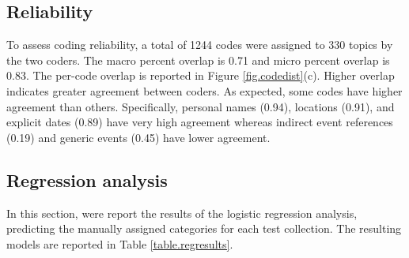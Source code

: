 \documentclass[runningheads,a4paper]{llncs}
\begin{document}

\subsection{Reliability}

To assess coding reliability, a total of 1244 codes were assigned to 330 topics by the two coders. The macro percent overlap is 0.71 and  micro percent overlap is 0.83. The per-code overlap is reported in Figure \ref{fig.codedist}(c). Higher overlap indicates greater agreement between coders. As expected, some codes have higher agreement than others. Specifically, personal names (0.94), locations (0.91), and explicit dates (0.89) have very high agreement whereas indirect event references (0.19) and generic events (0.45) have lower agreement.



\subsection{Regression analysis}

In this section, were report the results of the logistic regression analysis, predicting the manually assigned categories for each test collection. The resulting models are reported in Table \ref{table.regresults}. 
\end{document}
